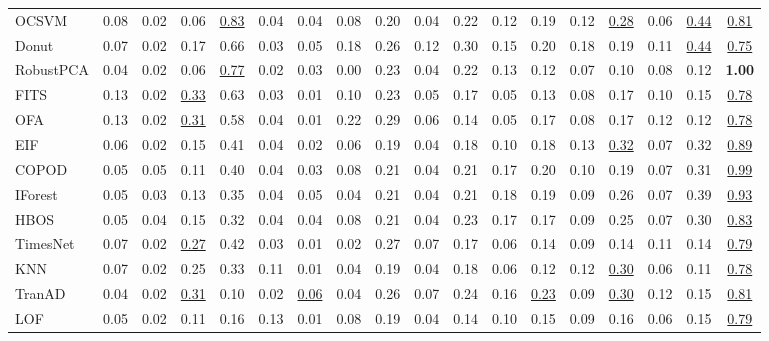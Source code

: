 \documentclass[border=2pt]{standalone}
\begin{document}
\begin{tabular}{l|ccccccccccccccccc}
OCSVM                  & 0.08 & 0.02 & 0.06 & \underline{0.83} & 0.04 & 0.04 & 0.08 & 0.20 & 0.04 & 0.22 & 0.12 & 0.19 & 0.12 & \underline{0.28} & 0.06 & \underline{0.44} & \underline{0.81} \\
Donut                  & 0.07 & 0.02 & 0.17 & 0.66 & 0.03 & 0.05 & 0.18 & 0.26 & 0.12 & 0.30 & 0.15 & 0.20 & 0.18 & 0.19 & 0.11 & \underline{0.44} & \underline{0.75} \\
RobustPCA              & 0.04 & 0.02 & 0.06 & \underline{0.77} & 0.02 & 0.03 & 0.00 & 0.23 & 0.04 & 0.22 & 0.13 & 0.12 & 0.07 & 0.10 & 0.08 & 0.12 & \textbf{1.00} \\
FITS                   & 0.13 & 0.02 & \underline{0.33} & 0.63 & 0.03 & 0.01 & 0.10 & 0.23 & 0.05 & 0.17 & 0.05 & 0.13 & 0.08 & 0.17 & 0.10 & 0.15 & \underline{0.78} \\
OFA                    & 0.13 & 0.02 & \underline{0.31} & 0.58 & 0.04 & 0.01 & 0.22 & 0.29 & 0.06 & 0.14 & 0.05 & 0.17 & 0.08 & 0.17 & 0.12 & 0.12 & \underline{0.78} \\
EIF                    & 0.06 & 0.02 & 0.15 & 0.41 & 0.04 & 0.02 & 0.06 & 0.19 & 0.04 & 0.18 & 0.10 & 0.18 & 0.13 & \underline{0.32} & 0.07 & 0.32 & \underline{0.89} \\
COPOD                  & 0.05 & 0.05 & 0.11 & 0.40 & 0.04 & 0.03 & 0.08 & 0.21 & 0.04 & 0.21 & 0.17 & 0.20 & 0.10 & 0.19 & 0.07 & 0.31 & \underline{0.99} \\
IForest                & 0.05 & 0.03 & 0.13 & 0.35 & 0.04 & 0.05 & 0.04 & 0.21 & 0.04 & 0.21 & 0.18 & 0.19 & 0.09 & 0.26 & 0.07 & 0.39 & \underline{0.93} \\
HBOS                   & 0.05 & 0.04 & 0.15 & 0.32 & 0.04 & 0.04 & 0.08 & 0.21 & 0.04 & 0.23 & 0.17 & 0.17 & 0.09 & 0.25 & 0.07 & 0.30 & \underline{0.83} \\
TimesNet               & 0.07 & 0.02 & \underline{0.27} & 0.42 & 0.03 & 0.01 & 0.02 & 0.27 & 0.07 & 0.17 & 0.06 & 0.14 & 0.09 & 0.14 & 0.11 & 0.14 & \underline{0.79} \\
KNN                    & 0.07 & 0.02 & 0.25 & 0.33 & 0.11 & 0.01 & 0.04 & 0.19 & 0.04 & 0.18 & 0.06 & 0.12 & 0.12 & \underline{0.30} & 0.06 & 0.11 & \underline{0.78} \\
TranAD                 & 0.04 & 0.02 & \underline{0.31} & 0.10 & 0.02 & \underline{0.06} & 0.04 & 0.26 & 0.07 & 0.24 & 0.16 & \underline{0.23} & 0.09 & \underline{0.30} & 0.12 & 0.15 & \underline{0.81} \\
LOF                    & 0.05 & 0.02 & 0.11 & 0.16 & 0.13 & 0.01 & 0.08 & 0.19 & 0.04 & 0.14 & 0.10 & 0.15 & 0.09 & 0.16 & 0.06 & 0.15 & \underline{0.79} \\

\end{tabular}
\end{document}
